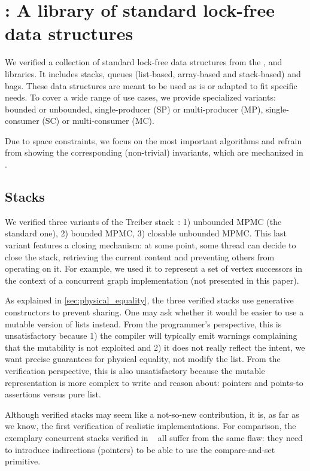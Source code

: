 \section{\Saturn: A library of standard lock-free data structures}
\label{sec:saturn}

We verified a collection of standard lock-free data structures from the \Saturn, \Eio and \Picos~\citep*{picos} libraries.
It includes stacks, queues (list-based, array-based and stack-based) and bags.
These data structures are meant to be used as is or adapted to fit specific needs.
To cover a wide range of use cases, we provide specialized variants: bounded or unbounded, single-producer (SP) or multi-producer (MP), single-consumer (SC) or multi-consumer (MC).

Due to space constraints, we focus on the most important algorithms and refrain from showing the corresponding (non-trivial) \Iris invariants, which are mechanized in \Rocq.

\subsection{Stacks}

We verified three variants of the Treiber stack~\citep*{thomas1986systems}: 1) unbounded MPMC (the standard one), 2) bounded MPMC, 3) closable unbounded MPMC.
This last variant features a closing mechanism: at some point, some thread can decide to close the stack, retrieving the current content and preventing others from operating on it.
For example, we used it to represent a set of vertex successors in the context of a concurrent graph implementation (not presented in this paper).

As explained in \cref{sec:physical_equality}, the three verified stacks use generative constructors to prevent sharing.
One may ask whether it would be easier to use a mutable version of lists instead.
From the programmer's perspective, this is unsatisfactory because 1) the compiler will typically emit warnings complaining that the mutability is not exploited and 2) it does not really reflect the intent, \ie we want precise guarantees for physical equality, not modify the list.
From the verification perspective, this is also unsatisfactory because the mutable representation is more complex to write and reason about: pointers and points-to assertions versus pure \Rocq list.

Although verified stacks may seem like a not-so-new contribution, it is, as far as we know, the first verification of realistic \OCaml implementations.
For comparison, the exemplary concurrent stacks verified in \Iris~\citep*{iris-examples} all suffer from the same flaw: they need to introduce indirections (pointers) to be able to use the compare-and-set primitive.

